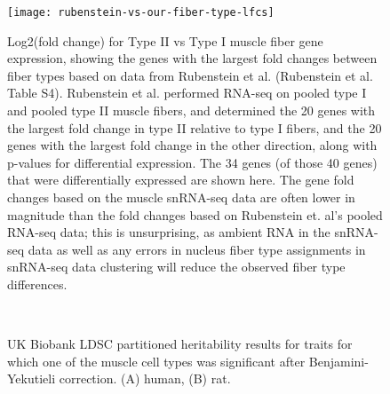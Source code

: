 \documentclass{article}
\begin{document}
\begin{figure}
\texttt{[image: rubenstein-vs-our-fiber-type-lfcs]}
	\caption{Log2(fold change) for Type II vs Type I muscle fiber gene expression, showing the genes with the largest fold changes between fiber types based on data from Rubenstein et al. (Rubenstein et al. Table S4). Rubenstein et al. performed RNA-seq on pooled type I and pooled type II muscle fibers, and determined the 20 genes with the largest fold change in type II relative to type I fibers, and the 20 genes with the largest fold change in the other direction, along with p-values for differential expression. The 34 genes (of those 40 genes) that were differentially expressed are shown here. The gene fold changes based on the muscle snRNA-seq data are often lower in magnitude than the fold changes based on Rubenstein et. al's pooled RNA-seq data; this is unsurprising, as ambient RNA in the snRNA-seq data as well as any errors in nucleus fiber type assignments in snRNA-seq data clustering will reduce the observed fiber type differences.}
\end{figure}

\begin{figure}
	\\
	\caption{UK Biobank LDSC partitioned heritability results for traits for which one of the muscle cell types was significant after Benjamini-Yekutieli correction. (A) human, (B) rat.}
\end{figure}

\end{document}
